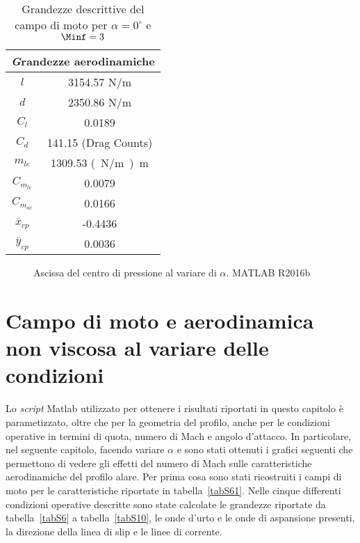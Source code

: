 \begin{table} [!h]\centering {}
\begin{tabular}{c c}
\toprule
\multicolumn{2}{c}{{\emph Grandezze aerodinamiche}}  \\ 
\bottomrule
\toprule
 $l$ &   3154.57 \si{N/m}\\ 
\midrule
 $d$ &   2350.86 \si{N/m}\\ 
\midrule
 $C_l$ &  0.0189\\ 
\midrule
 $C_d$ &   141.15 (Drag Counts)\\ 
\midrule
$m_{le}$ &   1309.53 \si{(N/m).m}\\ 
\midrule
$C_{m_{le}}$ & 0.0079\\ 
\midrule
$C_{m_{ac}}$ &  0.0166 \\ 
\midrule
 $\overline{x}_{cp}$ &   -0.4436 \\ 
\midrule
$\overline{y}_{cp}$ &   0.0036 \\ 
\bottomrule
\end{tabular}
\caption {\footnotesize Grandezze descrittive del campo di moto per $\alpha=0^\circ$ e $\Minf=3$}
\label{tabS6}
\end{table}


\begin{figure} [h!]
\centering
{}
\caption{\footnotesize Ascissa del centro di pressione al variare di ${\alpha}$. MATLAB R2016b}
\label{figS6}
\end{figure}

\chapter{Campo di moto e aerodinamica non viscosa al variare delle condizioni}
Lo {\itshape script} Matlab utilizzato per ottenere i risultati riportati in questo capitolo è parametizzato, oltre che per la geometria del profilo, anche per le condizioni operative in termini di quota, numero di Mach e angolo d'attacco. In particolare, nel seguente capitolo, facendo variare $\alpha$ e \Minf sono stati ottenuti i grafici seguenti che permettono di vedere gli effetti del numero di Mach sulle caratteristiche aerodinamiche del profilo alare.
Per prima cosa sono stati ricostruiti i campi di moto per le caratteristiche riportate in tabella~\vref{tabS61}.
Nelle cinque differenti condizioni operative descritte sono state calcolate le grandezze riportate da tabella~\vref{tabS6} a tabella~\vref{tabS10}, le onde d'urto e le onde di aspansione presenti, la direzione della linea di slip e le linee di corrente.


